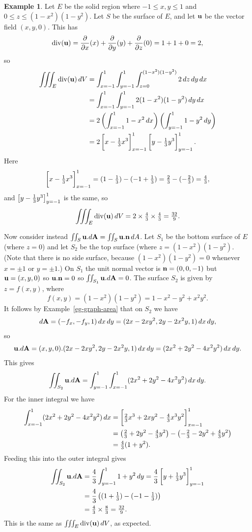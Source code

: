 \documentclass[reqno]{amsart}
\theoremstyle{definition}
\newtheorem{example}[theorem]{Example}
\begin{document}
\begin{example}
 Let $E$ be the solid region where $-1\leq x,y\leq 1$ and
 $0\leq z\leq(1-x^2)(1-y^2)$.  Let $S$ be the surface of $E$, and let
 $\mathbf{u}$ be the vector field $(x,y,0)$.  This has 
 \[ \operatorname{div}(\mathbf{u})=\frac{\partial}{\partial x}(x)+\frac{\partial}{\partial y}(y)+\frac{\partial}{\partial z}(0)=1+1+0=2, \]
 so 
 \begin{align*}
  \iiint_E\dv(\vu)\,dV 
   &= \int_{x=-1}^1 \int_{y=-1}^1 \int_{z=0}^{(1-x^2)(1-y^2)}
       2\,dz\,dy\,dx \\
   &= \int_{x=-1}^1 \int_{y=-1}^1 2(1-x^2)(1-y^2)\,dy\,dx \\
   &= 2 \left(\int_{x=-1}^1 1-x^2\,dx\right)
        \left(\int_{y=-1}^1 1-y^2\,dy\right) \\
   &= 2\CH{x-\tfrac{1}{3}x^3}_{x=-1}^1 
       \CH{y-\tfrac{1}{3}y^3}_{y=-1}^1.
 \end{align*}
 Here 
 \[ \CH{x-\tfrac{1}{3}x^3}_{x=-1}^1 = 
     (1-\tfrac{1}{3}) - (-1+\tfrac{1}{3}) = 
     \tfrac{2}{3} - (-\tfrac{2}{3}) = \tfrac{4}{3},
 \]
 and $\CH{y-\tfrac{1}{3}y^3}_{y=-1}^1$ is the same, so 
 \[ \iiint_E\operatorname{div}(\mathbf{u})\,dV = 2\times\tfrac{4}{3}\times\tfrac{4}{3} = 
     \tfrac{32}{9}.
 \]

 Now consider instead $\iint_S\mathbf{u}.d\mathbf{A}=\iint_S\mathbf{u}.\mathbf{n}\,dA$.  Let $S_1$
 be the bottom surface of $E$ (where $z=0$) and let $S_2$ be the top
 surface (where $z=(1-x^2)(1-y^2)$.  (Note that there is no side
 surface, because $(1-x^2)(1-y^2)=0$ whenever $x=\pm 1$ or $y=\pm 1$.)
 On $S_1$ the unit normal vector is $\mathbf{n}=(0,0,-1)$ but $\mathbf{u}=(x,y,0)$
 so $\mathbf{u}.\mathbf{n}=0$ so $\iint_{S_1}\mathbf{u}.d\mathbf{A}=0$.  The surface $S_2$ is
 given by $z=f(x,y)$, where 
 \[ f(x,y)=(1-x^2)(1-y^2) = 1-x^2-y^2+x^2y^2. \]
 It follows by Example~\ref{eg-graph-area} that on $S_2$ we have 
 \[ d\mathbf{A} = (-f_x,-f_y,1)\,dx\,dy =
     (2x-2xy^2,2y-2x^2y,1)\,dx\,dy,
 \]
 so 
 \[ \mathbf{u}.d\mathbf{A} =
     (x,y,0) . (2x-2xy^2,2y-2x^2y,1)\,dx\,dy = 
       (2x^2+2y^2-4x^2y^2)\,dx\,dy.
 \]
 This gives
 \[ \iint_{S_2} \mathbf{u}.d\mathbf{A} =
     \int_{y=-1}^1\int_{x=-1}^1 (2x^2+2y^2-4x^2y^2)\,dx\,dy.
 \]
 For the inner integral we have 
 \begin{align*}
  \int_{x=-1}^1 (2x^2+2y^2-4x^2y^2)\,dx
   &= \CH{\tfrac{2}{3}x^3 + 2xy^2 - \tfrac{4}{3}x^3y^2}_{x=-1}^1 \\
   &= \left(\tfrac{2}{3} + 2y^2 - \tfrac{4}{3}y^2\right) - 
      \left(-\tfrac{2}{3} - 2y^2 + \tfrac{4}{3}y^2\right) \\
   &= \tfrac{4}{3}(1+y^2).
 \end{align*}
 Feeding this into the outer integral gives
 \begin{align*}
  \iint_{S_2} \vu.d\vA 
   &= \frac{4}{3}\int_{y=-1}^1 1+y^2\,dy 
    = \frac{4}{3}\CH{y+\tfrac{1}{3}y^3}_{y=-1}^1 \\
   &= \frac{4}{3}\left((1+\tfrac{1}{3}) - (-1-\tfrac{1}{3})\right) \\
   &= \tfrac{4}{3} \tm \tfrac{8}{3} = \tfrac{32}{9}.
 \end{align*}
 This is the same as $\iiint_E\operatorname{div}(\mathbf{u})\,dV$, as expected.
\end{example}
\end{document}
